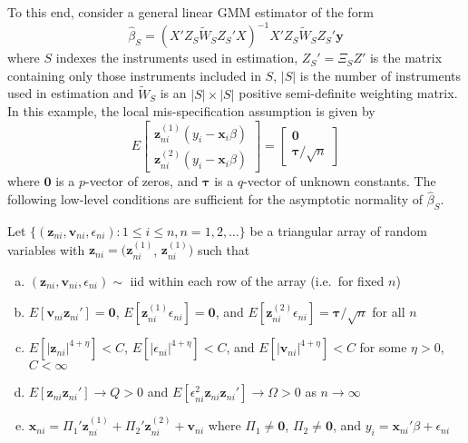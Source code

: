 To this end, consider a general linear GMM estimator of the form
$$\widehat{\beta}_S = (X'Z_S \widetilde{W}_S Z_S' X)^{-1}X'Z_S \widetilde{W}_S  Z_S' \mathbf{y}$$
where $S$ indexes the instruments used in estimation, $Z_S'  = \Xi_S Z'$ is the matrix containing only those instruments included in $S$, $|S|$ is the number of instruments used in estimation and $\widetilde{W}_S$ is an $|S|\times|S|$ positive semi-definite weighting matrix. In this example, the local mis-specification assumption is given by
\begin{equation}
  E\left[\begin{array}
    {c}
    \textbf{z}_{ni}^{(1)} (y_i - \textbf{x}_i\beta) \\
    \textbf{z}_{ni}^{(2)} (y_i - \textbf{x}_i \beta)
\end{array}\right] = \left[
  \begin{array}
    {c}
    \textbf{0} \\ \boldsymbol{\tau}/\sqrt{n}
  \end{array}
\right]
\end{equation}
where $\mathbf{0}$ is a $p$-vector of zeros, and $\boldsymbol{\tau}$ is a $q$-vector of unknown constants. 
The following low-level conditions are sufficient for the asymptotic normality of $\widehat{\beta}_S$.

\begin{assump}
\label{assump:chooseIV} 
	Let $\{(\mathbf{z}_{ni}, \mathbf{v}_{ni}, \epsilon_{ni})\colon 1\leq i \leq n, n = 1, 2, \hdots\}$ be a triangular array of random variables with $\mathbf{z}_{ni} = (\mathbf{z}_{ni}^{(1)}$, $\mathbf{z}_{ni}^{(1)})$ such that
	\begin{enumerate}[(a)]
		\item $(\mathbf{z}_{ni}, \mathbf{v}_{ni}, \epsilon_{ni}) \sim$ iid within each row of the array (i.e.\ for fixed $n$)
		\item $E[\mathbf{v}_{ni}\mathbf{z}_{ni}']=\mathbf{0}$, $E[\mathbf{z}^{(1)}_{ni} \epsilon_{ni}]=\mathbf{0}$, and $E[\mathbf{z}^{(2)}_{ni} \epsilon_{ni}] = \boldsymbol{\tau}/\sqrt{n}$ for all $n$
		\item $E[\left|\mathbf{z}_{ni}\right|^{4+\eta}] <C$, $E[\left|\epsilon_{ni}\right|^{4+\eta}] <C$, and $E[\left|\mathbf{v}_{ni}\right|^{4+\eta}] <C$ for some $\eta >0$, $C <\infty$
		\item $E[\mathbf{z}_{ni} \mathbf{z}_{ni}'] \rightarrow Q>0$ and $E[\epsilon_{ni}^2 \mathbf{z}_{ni} \mathbf{z}_{ni}'] \rightarrow \Omega >0$ as $n\rightarrow \infty$
		\item $\mathbf{x}_{ni} =  \Pi_1' \mathbf{z}_{ni}^{(1)} + \Pi_2'\mathbf{z}_{ni}^{(2)} + \mathbf{v}_{ni}$ where $\Pi_1 \neq \mathbf{0}$, $\Pi_2 \neq \mathbf{0}$, and $y_i = \mathbf{x}_{ni}' \beta +  \epsilon_{ni}$
	\end{enumerate}
\end{assump}

